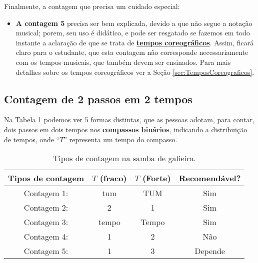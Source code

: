 Finalmente, a contagem que precisa um cuidado especial:
\begin{itemize}

\item \textbf{A contagem 5} precisa ser bem explicada, 
devido a que não segue a notação musical; 
porem, seu uso é didático, e pode ser resgatado se fazemos em todo instante a aclaração de 
que se trata de \hyperref[sec:TemposCoreograficos]{\textbf{tempos coreográficos}}.
Assim, ficará claro para o estudante, 
que esta contagem não corresponde necessariamente com os tempos musicais, 
que também devem ser ensinados.
Para mais detalhes sobre os tempos coreográficos ver a Seção \ref{sec:TemposCoreograficos}.

\end{itemize}


\subsection{Contagem de 2 passos em 2 tempos}

Na Tabela \ref{tab:ritmoconta2}  podemos ver 5 formas distintas, que  as pessoas adotam, 
para contar, dois passos em dois tempos nos \hyperref[subsec:compassobinario]{\textbf{compassos binários}}, 
indicando a distribuição de tempos, 
onde ``$T$'' representa um tempo do compasso.

\begin{table}[ht]
  \centering
  \begin{tabular}    {c|cc|c}
    \hline
    Tipos de contagem       & $T$ (fraco)  & $T$ (Forte)& Recomendável?\\
    \hline
    Contagem 1: & tum  & TUM  & Sim\\
    Contagem 2: & 2     & 1     & Sim\\
    Contagem 3: & tempo & Tempo & Sim\\ \hline
    Contagem 4: & 1     & 2     & Não\\ \hline
    Contagem 5: & 1     & 3     & Depende\\  \hline
    \hline
  \end{tabular}
  \caption{Tipos de contagem na samba de gafieira.}
\label{tab:ritmoconta2}
\end{table}



